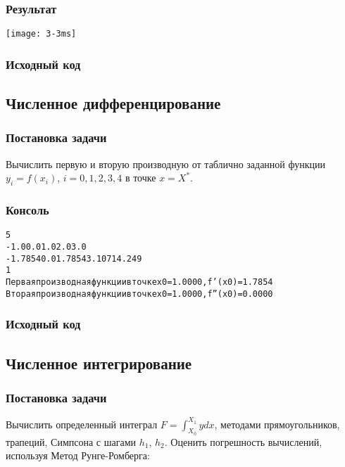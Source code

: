 \subsubsection{Результат}
\begin{center}
\texttt{[image: 3-3ms]}
\end{center}
\pagebreak

\subsubsection{Исходный код}

\pagebreak

\subsection{Численное дифференцирование}

\subsubsection{Постановка задачи}
Вычислить первую и вторую производную от таблично заданной функции $y_i = f(x_i)$, $i = 0, 1, 2, 3, 4$ в точке $x = X^*$.

\subsubsection{Консоль}
\begin{alltt}
5
-1.0 0.0 1.0 2.0 3.0
-1.7854 0.0 1.7854 3.1071 4.249
1
Первая производная функции в точке x0 = 1.0000, f'(x0) = 1.7854
Вторая производная функции в точке x0 = 1.0000, f''(x0) = 0.0000
\end{alltt}
\pagebreak

\subsubsection{Исходный код}

\pagebreak

\subsection{Численное интегрирование}

\subsubsection{Постановка задачи}
Вычислить определенный интеграл $F = \int_{X_0}^{X_1}{y dx}$, методами прямоугольников, трапеций, Симпсона с шагами $h_1$, $h_2$. Оценить погрешность вычислений, используя Метод Рунге-Ромберга:

